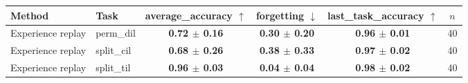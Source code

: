 \begin{tabular}{llcccc}
\toprule
Method & Task & average\_accuracy $\uparrow$ & forgetting $\downarrow$ & last\_task\_accuracy $\uparrow$ & $n$ \\
\midrule
Experience replay & perm\_dil & \textbf{0.72 $\pm$ 0.16} & \textbf{0.30 $\pm$ 0.20} & \textbf{0.96 $\pm$ 0.01} & 40 \\
\midrule
Experience replay & split\_cil & \textbf{0.68 $\pm$ 0.26} & \textbf{0.38 $\pm$ 0.33} & \textbf{0.97 $\pm$ 0.02} & 40 \\
\midrule
Experience replay & split\_til & \textbf{0.96 $\pm$ 0.03} & \textbf{0.04 $\pm$ 0.04} & \textbf{0.98 $\pm$ 0.02} & 40 \\
\bottomrule
\end{tabular}
